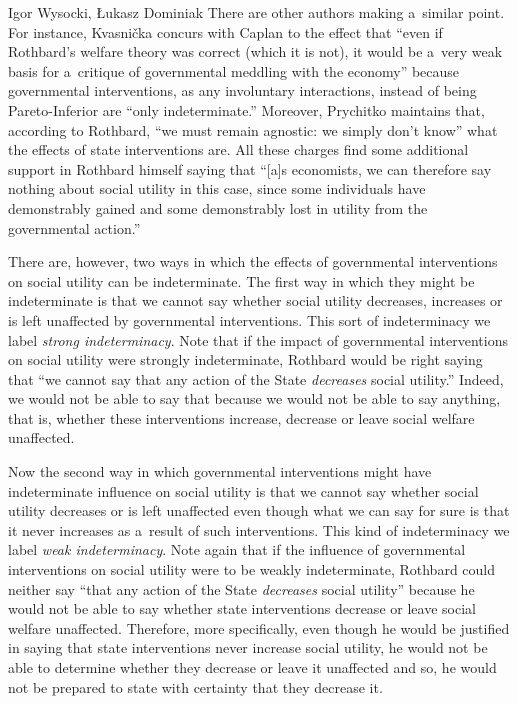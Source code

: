 \begin{artengenv}{Igor Wysocki, Łukasz Dominiak}
There are other authors making a~similar point. For instance, Kvasnička 
\parencite*[][p.49]{kvasnicka_rothbards_2008} %
 concurs with Caplan to the effect that ``even if Rothbard's welfare theory was correct (which it is not), it would be a~very weak basis for a~critique of governmental meddling with the economy'' because governmental interventions, as any involuntary interactions, instead of being Pareto-Inferior are ``only indeterminate.'' Moreover, Prychitko 
\parencite*[][p.576]{prychitko_formalism_1993} %
 maintains that, according to Rothbard, ``we must remain agnostic: we simply don't know'' what the effects of state interventions are. All these charges find some additional support in Rothbard 
\parencite*[][p.252]{rothbard_toward_2008} %
 himself saying that ``[a]s economists, we can therefore say nothing about social utility in this case, since some individuals have demonstrably gained and some demonstrably lost in utility from the governmental action.''



There are, however, two ways in which the effects of governmental interventions on social utility can be indeterminate. The first way in which they might be indeterminate is that we cannot say whether social utility decreases, increases or is left unaffected by governmental interventions. This sort of indeterminacy we label \textit{strong indeterminacy}. Note that if the impact of governmental interventions on social utility were strongly indeterminate, Rothbard would be right saying that ``we cannot say that any action of the State \textit{decreases} social utility.'' Indeed, we would not be able to say that because we would not be able to say anything, that is, whether these interventions increase, decrease or leave social welfare unaffected.



Now the second way in which governmental interventions might have indeterminate influence on social utility is that we cannot say whether social utility decreases or is left unaffected even though what we can say for sure is that it never increases as a~result of such interventions. This kind of indeterminacy we label \textit{weak indeterminacy}. Note again that if the influence of governmental interventions on social utility were to be weakly indeterminate, Rothbard could neither say ``that any action of the State \textit{decreases} social utility'' because he would not be able to say whether state interventions decrease or leave social welfare unaffected. Therefore, more specifically, even though he would be justified in saying that state interventions never increase social utility, he would not be able to determine whether they decrease or leave it unaffected and so, he would not be prepared to state with certainty that they decrease it.




\end{artengenv}
